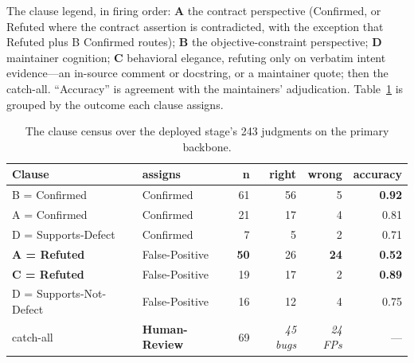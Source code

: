 \documentclass[acmsmall,screen,review,anonymous]{acmart}
\begin{document}
The clause legend, in firing order: \textbf{A} the contract perspective (Confirmed, or Refuted where
the contract assertion is contradicted, with the exception that Refuted plus B Confirmed routes);
\textbf{B} the objective-constraint perspective; \textbf{D} maintainer cognition; \textbf{C}
behavioral elegance, refuting only on verbatim intent evidence---an in-source comment or docstring,
or a maintainer quote; then the catch-all. ``Accuracy'' is agreement with the maintainers'
adjudication. Table~\ref{tab:census} is grouped by the outcome each clause assigns.

\begin{table}[t]
\caption{The clause census over the deployed stage's 243 judgments on the primary backbone.}
\label{tab:census}
\footnotesize
\begin{tabular}{@{}llrrrr@{}}
\toprule
Clause & assigns & n & right & wrong & accuracy \\
\midrule
B = Confirmed & Confirmed & 61 & 56 & 5 & \textbf{0.92} \\
A = Confirmed & Confirmed & 21 & 17 & 4 & 0.81 \\
D = Supports-Defect & Confirmed & 7 & 5 & 2 & 0.71 \\
\textbf{A = Refuted} & False-Positive & \textbf{50} & 26 & \textbf{24} & \textbf{0.52} \\
\textbf{C = Refuted} & False-Positive & 19 & 17 & 2 & \textbf{0.89} \\
D = Supports-Not-Defect & False-Positive & 16 & 12 & 4 & 0.75 \\
catch-all & \textbf{Human-Review} & 69 & \emph{45 bugs} & \emph{24 FPs} & --- \\
\bottomrule
\end{tabular}
\end{table}
\end{document}
